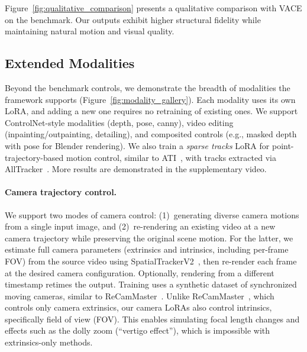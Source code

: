 

Figure~\ref{fig:qualitative_comparison} presents a qualitative comparison with VACE on the benchmark. Our outputs exhibit higher structural fidelity while maintaining natural motion and visual quality.

\subsection{Extended Modalities}
\label{sec:modalities}



Beyond the benchmark controls, we demonstrate the breadth of modalities the framework supports (Figure~\ref{fig:modality_gallery}). Each modality uses its own LoRA, and adding a new one requires no retraining of existing ones. We support ControlNet-style modalities (depth, pose, canny), video editing (inpainting/outpainting, detailing), and composited controls (e.g., masked depth with pose for Blender rendering). We also train a \emph{sparse tracks} LoRA for point-trajectory-based motion control, similar to ATI~\cite{wang2025ati}, with tracks extracted via AllTracker~\cite{harley2025alltracker}. More results are demonstrated in the supplementary video.

\paragraph{Camera trajectory control.}
\label{sec:camera}
We support two modes of camera control: (1)~generating diverse camera motions from a single input image, and (2)~re-rendering an existing video at a new camera trajectory while preserving the original scene motion. For the latter, we estimate full camera parameters (extrinsics and intrinsics, including per-frame FOV) from the source video using SpatialTrackerV2~\cite{xiao2025spatialtracker}, then re-render each frame at the desired camera configuration. Optionally, rendering from a different timestamp retimes the output. Training uses a synthetic dataset of synchronized moving cameras, similar to ReCamMaster~\cite{bai2025recammaster}.
Unlike ReCamMaster~\cite{bai2025recammaster}, which controls only camera extrinsics, our camera LoRAs also control intrinsics, specifically field of view (FOV). This enables simulating focal length changes and effects such as the dolly zoom (``vertigo effect''), which is impossible with extrinsics-only methods.



